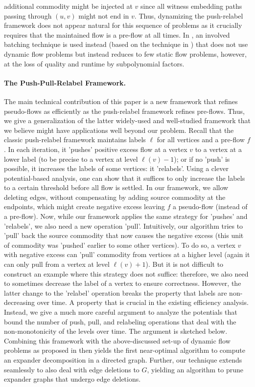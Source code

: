 \documentclass[11pt]{article}
\newcommand\bell{\boldsymbol{\mathit{\ell}}}
\newcommand\ff{\boldsymbol{\mathit{f}}}
\begin{document}
additional commodity might be injected at $v$ since all witness embedding paths passing through $(u,v)$ might not end in $v$. Thus, dynamizing the push-relabel framework does not appear natural for this sequence of problems as it crucially requires that the maintained flow is a pre-flow at all times. In \cite{hua2023maintaining}, an involved batching technique is used instead (based on the technique in \cite{nanongkai2017dynamicMinimum}) that does not use dynamic flow problems but instead reduces to few static flow problems, however, at the loss of quality and runtime by subpolynomial factors.


\paragraph{The Push-Pull-Relabel Framework.} The main technical contribution of this paper is a new framework that refines pseudo-flows as efficiently as the push-relabel framework refines pre-flows. Thus, we give a generalization of the latter widely-used and well-studied framework that we believe might have applications well beyond our problem. Recall that the classic push-relabel framework maintains labels $\bell$ for all vertices and a pre-flow $\ff$. In each iteration, it 'pushes' positive excess flow at a vertex $v$ to a vertex at a lower label (to be precise to a vertex at level $\bell(v) - 1$); or if no 'push' is possible, it increases the labels of some vertices: it 'relabels'. Using a clever potential-based analysis, one can show that it suffices to only increase the labels to a certain threshold before all flow is settled. In our framework, we allow deleting edges, without compensating by adding source commodity at the endpoints, which might create negative excess leaving $\ff$ a pseudo-flow (instead of a pre-flow). Now, while our framework applies the same strategy for 'pushes' and 'relabels', we also need a new operation 'pull'. Intuitively, our algorithm tries to 'pull' back the source commodity that now causes the negative excess (this unit of commodity was 'pushed' earlier to some other vertices). To do so, a vertex $v$ with negative excess can 'pull' commodity from vertices at a higher level (again it can only pull from a vertex at level $\bell(v) + 1$). But it is not difficult to construct an example where this strategy does not suffice: therefore, we also need to sometimes decrease the label of a vertex to ensure correctness. However, the latter change to the 'relabel' operation breaks the property that labels are non-decreasing over time. A property that is crucial in the existing efficiency analysis. Instead, we give a much more careful argument to analyze the potentials that bound the number of push, pull, and relabeling operations that deal with the non-monotonicity of the levels over time. The argument is sketched below. Combining this framework with the above-discussed set-up of dynamic flow problems as proposed in \cite{hua2023maintaining} then yields the first near-optimal algorithm to compute an expander decomposition in a directed graph. Further, our technique extends seamlessly to also deal with edge deletions to $G$, yielding an algorithm to prune expander graphs that undergo edge deletions.
\end{document}
